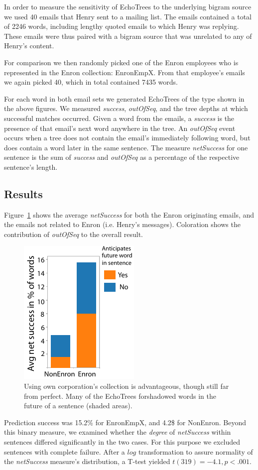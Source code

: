\documentclass{sigchi}
\begin{document}
In order to measure the sensitivity of EchoTrees to the underlying
bigram source we used 40 emails that Henry sent to a mailing list. The
emails contained a total of 2246 words, including lengthy quoted
emails to which Henry was replying. These emails were thus paired with
a bigram source that was unrelated to any of Henry's content.

For comparison we then randomly picked one of the Enron employees
who is represented in the Enron collection: EnronEmpX. From that
employee's emails we again picked 40, which in total contained 7435
words. 

For each word in both email sets we generated EchoTrees of the type
shown in the above figures. We measured {\em success}, {\em outOfSeq},
and the tree depths at which successful matches occurred. Given a word
from the emails, a {\em success} is the presence of that email's next
word anywhere in the tree. An {\em outOfSeq} event occurs when a tree
does not contain the email's immediately following word, but does
contain a word later in the same sentence. The measure {\em
  netSuccess} for one sentence is the sum of {\em success} and {\em
  outOfSeq} as a percentage of the respective sentence's length.

\subsection{Results}
Figure~\ref{fig:netSuccess} shows the average {\em netSuccess} for
both the Enron originating emails, and the emails not related to Enron
(i.e. Henry's messages). Coloration shows the contribution of {\em
  outOfSeq} to the overall result.
\begin{figure}
   \centering
   \includegraphics{Figs/relativeNetSuccessBarGraphCleanedSmall.pdf}
   \caption{Using own corporation's collection is advantageous, though
     still far from perfect. Many of the EchoTrees forshadowed words
     in the future of a sentence (shaded areas).}
   \label{fig:netSuccess}
\end{figure}
Prediction success was 15.2\% for EnronEmpX, and 4.2\$ for
NonEnron. Beyond this binary measure, we examined whether the {\em
  degree} of {\em netSuccess} within sentences differed significantly
in the two cases. For this purpose we excluded sentences with complete
failure. After a $log$ transformation to assure normality of the {\em
  netSuccess} measure's distribution, a T-test yielded $t(319)=-4.1,
p<.001$.
\end{document}
